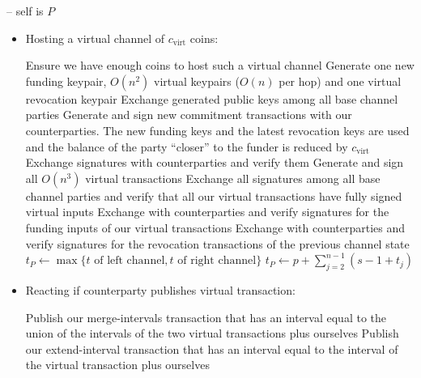 \begin{center}
\begin{processbox}{\pchan -- self is $P$}
\begin{itemize}
      \item Hosting a virtual channel of $c_{\mathrm{virt}}$ coins:
      \begin{algorithmic}[0]
        \State Ensure we have enough coins to host such a virtual channel
        \State Generate one new funding keypair, $O(n^2)$ virtual keypairs
        ($O(n)$ per hop) and one virtual revocation keypair 
        \State Exchange generated public keys among all base channel parties
        \State Generate and sign new commitment transactions with our
        counterparties. The new funding keys and the latest revocation keys are
        used and the balance of the party ``closer'' to the funder is reduced by
        $c_{\mathrm{virt}}$ 
        \State Exchange signatures with counterparties and verify them
        \State Generate and sign all $O(n^3)$ virtual transactions 
        \State Exchange all signatures among all base channel parties and verify
        that all our virtual transactions have fully signed virtual inputs
        \State Exchange with counterparties and verify signatures for the
        funding inputs of our virtual transactions 
        \State Exchange with counterparties and verify signatures for the
        revocation transactions of the previous channel state
          \State $t_P \gets \max\{t \text{ of left channel}, t \text{ of right
          channel}\}$
        \Else \: 
          \State $t_P \gets p + \sum\limits_{j = 2}^{n-1}(s - 1 + t_j)$
        \EndIf
      \end{algorithmic}

      \item Reacting if counterparty publishes virtual transaction:
      \begin{algorithmic}[0]
          \State Publish our merge-intervals transaction that has an interval
          equal to the union of the intervals of the two virtual transactions
          plus ourselves
        \Else \: 
          \State Publish our extend-interval transaction that has an interval
          equal to the interval of the virtual transaction plus ourselves
        \EndIf
      \end{algorithmic}


\end{itemize}
\end{processbox}
\end{center}

